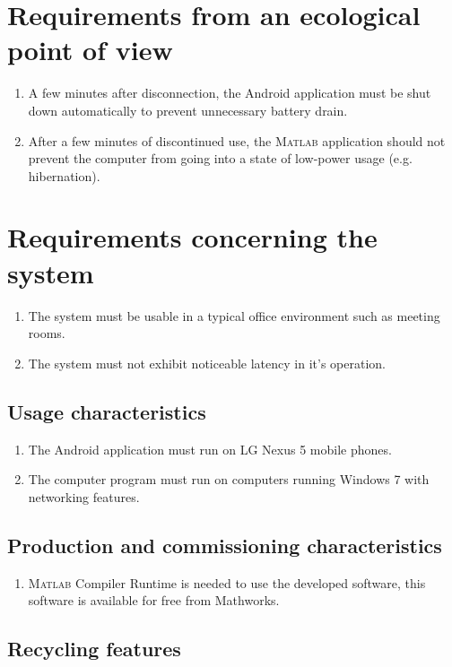 \documentclass[a4paper]{article}
\newcommand{\matlab}{\textsc{Matlab} } %
\begin{document}
\section{Requirements from an ecological point of view}
\begin{enumerate}
\item A few minutes after disconnection, the Android application must be shut down automatically to prevent unnecessary battery drain.
\item After a few minutes of discontinued use, the \matlab application should not prevent the computer from going into a state of low-power usage (e.g. hibernation).
\end{enumerate}

\section{Requirements concerning the system}
\begin{enumerate}
\item The system must be usable in a typical office environment such as meeting rooms.
\item The system must not exhibit noticeable latency in it's operation.
\end{enumerate}

\subsection{Usage characteristics} 
\begin{enumerate}
\item The Android application must run on LG Nexus 5 mobile phones.
\item The computer program must run on computers running Windows 7 with networking features.
\end{enumerate}

\subsection{Production and commissioning characteristics}
\begin{enumerate}
\item \matlab Compiler Runtime is needed to use the developed software, this software is available for free from Mathworks. 
\end{enumerate} 
\subsection{Recycling features}
\end{document}

